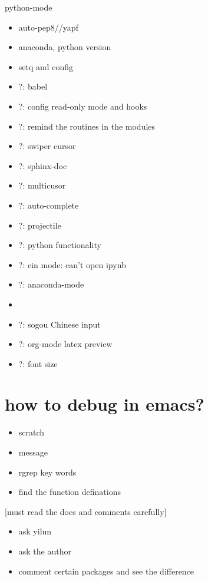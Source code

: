 \documentclass[11pt]{article}
\begin{document}
python-mode
\begin{itemize}
\item auto-pep8//yapf
\item anaconda, python version
\item setq and config

\item ?: babel
\item ?: config read-only mode and hooks
\item ?: remind the routines in the modules
\item ?: swiper cursor

\item ?: sphinx-doc
\item ?: multicusor
\item ?: auto-complete
\item ?: projectile
\item ?: python functionality
\item ?: ein mode: can't open ipynb
\item ?: anaconda-mode
\item 


\item ?: sogou Chinese input
\item ?: org-mode latex preview
\item ?: font size
\end{itemize}

\section{how to debug in emacs?}
\label{sec:org113c09a}
\begin{itemize}
\item scratch
\item message
\item rgrep key words
\item find the function definations
\end{itemize}
[must read the docs and comments carefully]
\begin{itemize}
\item ask yilun
\item ask the author

\item comment certain packages and see the difference
\end{itemize}
\end{document}
